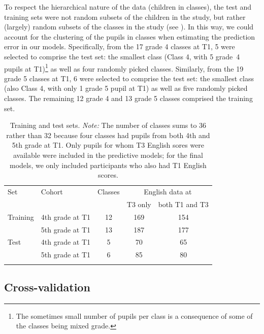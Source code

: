 \documentclass[output=paper]{langsci/langscibook}
\begin{document}
To respect the hierarchical nature of the data (children in classes), the test and training sets were not random subsets of the children in the study, but rather (largely) random subsets of the classes in the study (see \citealt{RobertsEtAl2017}). In this way, we could account for the clustering of the pupils in classes when estimating the prediction error in our models. Specifically, from the 17 grade 4 classes at T1, 5 were selected to comprise the test set: the smallest class (Class 4, with 5 grade~4 pupils at T1)\footnote{The sometimes small number of pupils per class is a consequence of some of the classes being mixed grade.} as well as four randomly picked classes. Similarly, from the 19 grade 5 classes at T1, 6 were selected to comprise the test set: the smallest class (also Class 4, with only 1 grade 5 pupil at T1) as well as five randomly picked classes. The remaining 12 grade 4 and 13 grade 5 classes comprised the training set.


\begin{table}
\caption{Training and test sets. \emph{Note:} The number of classes sums to 36 rather than 32 because four classes had pupils from both 4th and 5th grade at T1. Only pupils for whom T3 English sores were available were included in the predictive models; for the final models, we only included participants who also had T1 English scores.\label{tab:04:1}}
\begin{tabular}{ll *{3}{c}}
\lsptoprule
{Set} & {Cohort} & {Classes} & \multicolumn{2}{c}{English data at}\\\cmidrule(lr){4-5}
      &          &           & {T3 only} & {both T1 and T3}\\\midrule
{Training} & {4th grade at T1} & {12} & {169} & {154}\\
           & {5th grade at T1} & {13} & {187} & {177}\\
{Test}     & {4th grade at T1} & {5} & {70} & {65}\\
           & {5th grade at T1} & {6} & {85} & {80}\\
\lspbottomrule
\end{tabular}
\end{table}


\subsection{Cross-validation}\label{sec:04:3.2}
\end{document}
